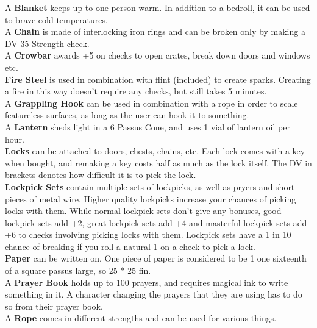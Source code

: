 A \textbf{Blanket} keeps up to one person warm. In addition to a bedroll, it can be used to brave cold temperatures.\\

A \textbf{Chain} is made of interlocking iron rings and can be broken only by making a DV 35 Strength check.\\

A \textbf{Crowbar} awards +5 on checks to open crates, break down doors and windows etc.\\

\textbf{Fire Steel} is used in combination with flint (included) to create sparks. Creating a fire in this way doesn't require any checks, but still takes 5 minutes.\\

A \textbf{Grappling Hook} can be used in combination with a rope in order to scale featureless surfaces, as long as the user can hook it to something.\\

A \textbf{Lantern} sheds light in a 6 Passus Cone, and uses 1 vial of lantern oil per hour.\\

\textbf{Locks} can be attached to doors, chests, chains, etc. Each lock comes with a key when bought, and remaking a key costs half as much as the lock itself. The DV in brackets denotes how difficult it is to pick the lock.\\

\textbf{Lockpick Sets} contain multiple sets of lockpicks, as well as pryers and short pieces of metal wire. Higher quality lockpicks increase your chances of picking locks with them. While normal lockpick sets don't give any bonuses, good lockpick sets add +2, great lockpick sets add +4 and masterful lockpick sets add +6 to checks involving picking locks with them. Lockpick sets have a 1 in 10 chance of breaking if you roll a natural 1 on a check to pick a lock.\\

\textbf{Paper} can be written on. One piece of paper is considered to be 1 one sixteenth of a square passus large, so 25 * 25 fin.\\

A \textbf{Prayer Book} holds up to 100 prayers, and requires magical ink to write something in it. A character changing the prayers that they are using has to do so from their prayer book.\\

A \textbf{Rope} comes in different strengths and can be used for various things.\\

